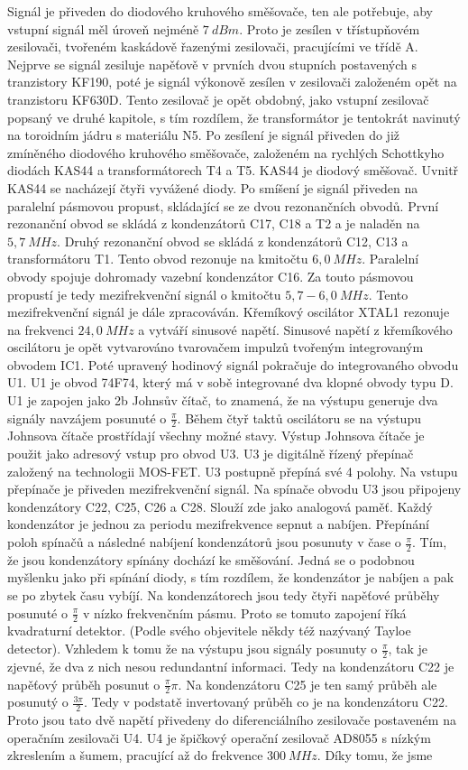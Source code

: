 Signál je přiveden do diodového kruhového směšovače, ten ale potřebuje, aby vstupní signál měl úroveň nejméně $7~dBm$. Proto je zesílen v třístupňovém zesilovači, tvořeném kaskádově řazenými zesilovači, pracujícími ve třídě A. Nejprve se signál zesiluje napěťově v prvních dvou stupních postavených s tranzistory KF190, poté je signál výkonově zesílen v zesilovači založeném opět na tranzistoru KF630D. Tento zesilovač je opět obdobný, jako vstupní zesilovač popsaný ve druhé kapitole, s tím rozdílem, že transformátor je tentokrát navinutý na toroidním jádru s materiálu N5. Po zesílení je signál přiveden do již zmíněného diodového kruhového směšovače, založeném na rychlých Schottkyho diodách KAS44 a transformátorech T4 a T5. KAS44 je diodový směšovač. Uvnitř KAS44 se nacházejí čtyři vyvážené diody. Po smíšení je signál přiveden na paralelní pásmovou propust, skládající se ze dvou rezonančních obvodů. První rezonanční obvod se skládá z kondenzátorů C17, C18 a T2 a je naladěn na $5,7~MHz$. Druhý rezonanční obvod se skládá z kondenzátorů C12, C13 a transformátoru T1. Tento obvod rezonuje na kmitočtu $6,0~MHz$. Paralelní obvody spojuje dohromady vazební kondenzátor C16. Za touto pásmovou propustí je tedy mezifrekvenční signál o kmitočtu $5,7-6,0~MHz$. Tento mezifrekvenční signál je dále zpracováván. Křemíkový oscilátor XTAL1 rezonuje na frekvenci $24,0~MHz$ a vytváří sinusové napětí. Sinusové napětí z křemíkového oscilátoru je opět vytvarováno tvarovačem impulzů tvořeným integrovaným obvodem IC1. Poté upravený hodinový signál pokračuje do integrovaného obvodu U1. U1 je obvod 74F74, který má v sobě integrované dva klopné obvody typu D. U1 je zapojen jako 2b Johnsův čítač, to znamená, že na výstupu generuje dva signály navzájem posunuté o $\frac{\pi}{2}$. Během čtyř taktů oscilátoru se na výstupu Johnsova čítače prostřídají všechny možné stavy. Výstup Johnsova čítače je použit jako adresový vstup pro obvod U3. U3 je digitálně řízený přepínač založený na technologii MOS-FET. U3 postupně přepíná své 4 polohy. Na vstupu přepínače je přiveden mezifrekvenční signál. Na spínače obvodu U3 jsou připojeny kondenzátory C22, C25, C26 a C28. Slouží zde jako analogová paměť. Každý kondenzátor je jednou za periodu  mezifrekvence sepnut a nabíjen. Přepínání poloh spínačů a následné nabíjení kondenzátorů jsou posunuty v čase o $\frac{\pi}{2}$. Tím, že jsou kondenzátory spínány dochází ke směšování. Jedná se o podobnou myšlenku jako při spínání diody, s tím rozdílem, že kondenzátor  je nabíjen a pak se po zbytek času vybíjí. Na kondenzátorech jsou tedy čtyři napěťové průběhy posunuté o $\frac{\pi}{2}$ v nízko frekvenčním pásmu. Proto se tomuto zapojení říká kvadraturní detektor. (Podle svého objevitele někdy též nazývaný Tayloe detector). Vzhledem k tomu že na výstupu jsou signály posunuty o $\frac{\pi}{2}$, tak je zjevné, že dva z nich nesou redundantní informaci. Tedy na kondenzátoru C22 je napěťový průběh posunut o $\frac{\pi}{2}\pi$. Na kondenzátoru C25 je ten samý průběh ale posunutý o $\frac{3\pi}{2}$. Tedy v podstatě invertovaný průběh co je na kondenzátoru C22. Proto jsou tato dvě napětí přivedeny do diferenciálního zesilovače postaveném na operačním zesilovači U4. U4 je špičkový operační zesilovač AD8055 s nízkým zkreslením a šumem, pracující až do frekvence $300~MHz$. Díky tomu, že jsme 